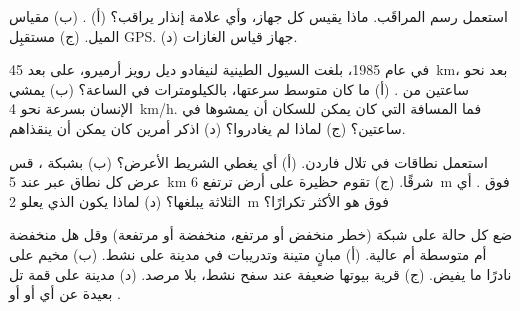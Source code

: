 \begin{exercise}[$\star$]\label{exo:g9:natural-risks:4}
استعمل رسم  المراقَب. ماذا يقيس كل جهاز، وأي علامة إنذار  يراقب؟
(أ) . (ب) مقياس الميل. (ج) مستقبِل GPS. (د) جهاز قياس
الغازات.
\end{exercise}

\begin{exercise}[$\star\star$]\label{exo:g9:natural-risks:5}
في عام 1985، بلغت السيول الطينية لنيفادو ديل رويز أرميرو، على بعد \qty{45}{km}،
بعد نحو ساعتين من . (أ) ما كان متوسط سرعتها، بالكيلومترات في الساعة؟
(ب) يمشي الإنسان بسرعة نحو \qty{4}{km/h}. فما المسافة التي كان يمكن للسكان أن
يمشوها في ساعتين؟ (ج) لماذا لم يغادروا؟ (د) اذكر أمرين كان يمكن أن
ينقذاهم.
\end{exercise}

\begin{exercise}[$\star\star$]\label{exo:g9:natural-risks:6}
استعمل  نطاقات  في تلال فاردن. (أ) أي  يغطي الشريط الأعرض؟
(ب) بشبكة ، قس عرض كل نطاق عبر  عند \qty{5}{km} شرقًا. (ج) تقوم
حظيرة على أرض ترتفع \qty{6}{m} فوق . أي  الثلاثة يبلغها؟ (د) لماذا
يكون  الذي يعلو \qty{2}{m} فوق  هو الأكثر
تكرارًا؟
\end{exercise}

\begin{exercise}[$\star\star$]\label{exo:g9:natural-risks:7}
ضع كل حالة على شبكة  (خطر منخفض أو مرتفع،  منخفضة أو مرتفعة)
وقل هل  منخفضة أم متوسطة أم عالية. (أ) مبانٍ متينة وتدريبات في مدينة على
 نشط. (ب) مخيم على   نادرًا ما يفيض. (ج) قرية بيوتها ضعيفة
عند سفح  نشط، بلا مرصد. (د) مدينة على قمة تل بعيدة عن أي  أو  أو
.
\end{exercise}

